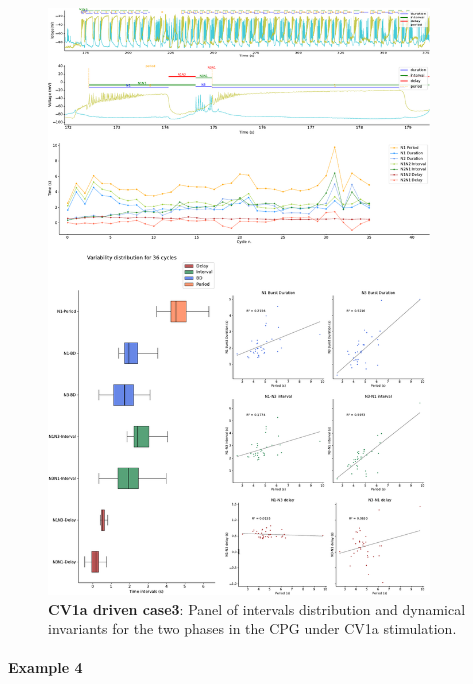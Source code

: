 \begin{figure}[htbp]
	\centering
	\includegraphics[width=0.9\textwidth]{./invariants/data/SUSSEX/CV1a_driven3/images/panel_with_intervals.pdf}
	\caption{\textbf{CV1a driven case3}: Panel of intervals distribution and dynamical invariants for the two phases in the CPG under CV1a stimulation.}
	\label{fig:cv1a 3 2phases}
\end{figure}



\paragraph{Example 4}

